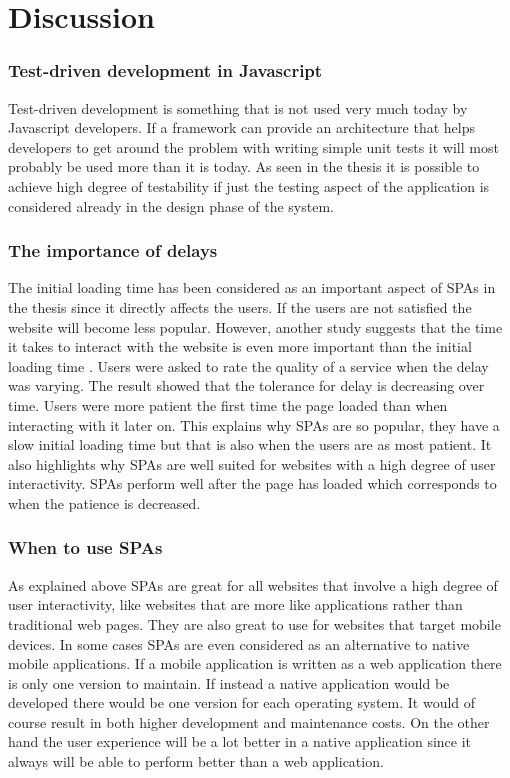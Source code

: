 \chapter{Discussion}

\setcounter{section}{7}
\setcounter{subsection}{0}

\subsection{Test-driven development in Javascript}

Test-driven development is something that is not used very much today by Javascript developers. If a framework can provide an architecture that helps developers to get around the problem with writing simple unit tests it will most probably be used more than it is today. As seen in the thesis it is possible to achieve high degree of testability if just the testing aspect of the application is considered already in the design phase of the system.

\subsection{The importance of delays}

The initial loading time has been considered as an important aspect of SPAs in the thesis since it directly affects the users. If the users are not satisfied the website will become less popular. However, another study suggests that the time it takes to interact with the website is even more important than the initial loading time \cite{user_interactivity_tolerance}. Users were asked to rate the quality of a service when the delay was varying. The result showed that the tolerance for delay is decreasing over time. Users were more patient the first time the page loaded than when interacting with it later on. This explains why SPAs are so popular, they have a slow initial loading time but that is also when the users are as most patient. It also highlights why SPAs are well suited for websites with a high degree of user interactivity. SPAs perform well after the page has loaded which corresponds to when the patience is decreased.

\subsection{When to use SPAs}

As explained above SPAs are great for all websites that involve a high degree of user interactivity, like websites that are more like applications rather than traditional web pages. They are also great to use for websites that target mobile devices. In some cases SPAs are even considered as an alternative to native mobile applications. If a mobile application is written as a web application there is only one version to maintain. If instead a native application would be developed there would be one version for each operating system. It would of course result in both higher development and maintenance costs. On the other hand the user experience will be a lot better in a native application since it always will be able to perform better than a web application. 

